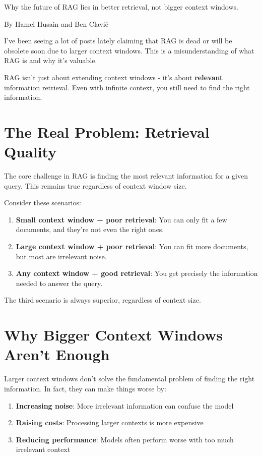 \documentclass[
  letterpaper,
  oneside]{scrbook}
\providecommand{\tightlist}{%
  \setlength{\itemsep}{0pt}\setlength{\parskip}{0pt}}\usepackage{longtable,booktabs,array}
\begin{document}
Why the future of RAG lies in better retrieval, not bigger context
windows.

By Hamel Husain and Ben Clavié

I've been seeing a lot of posts lately claiming that RAG is dead or will
be obsolete soon due to larger context windows. This is a
misunderstanding of what RAG is and why it's valuable.

RAG isn't just about extending context windows - it's about
\textbf{relevant} information retrieval. Even with infinite context, you
still need to find the right information.

\section{The Real Problem: Retrieval
Quality}\label{the-real-problem-retrieval-quality}

The core challenge in RAG is finding the most relevant information for a
given query. This remains true regardless of context window size.

Consider these scenarios:

\begin{enumerate}
\def\labelenumi{\arabic{enumi}.}
\tightlist
\item
  \textbf{Small context window + poor retrieval}: You can only fit a few
  documents, and they're not even the right ones.
\item
  \textbf{Large context window + poor retrieval}: You can fit more
  documents, but most are irrelevant noise.
\item
  \textbf{Any context window + good retrieval}: You get precisely the
  information needed to answer the query.
\end{enumerate}

The third scenario is always superior, regardless of context size.

\section{Why Bigger Context Windows Aren't
Enough}\label{why-bigger-context-windows-arent-enough}

Larger context windows don't solve the fundamental problem of finding
the right information. In fact, they can make things worse by:

\begin{enumerate}
\def\labelenumi{\arabic{enumi}.}
\tightlist
\item
  \textbf{Increasing noise}: More irrelevant information can confuse the
  model
\item
  \textbf{Raising costs}: Processing larger contexts is more expensive
\item
  \textbf{Reducing performance}: Models often perform worse with too
  much irrelevant context
\end{enumerate}
\end{document}
